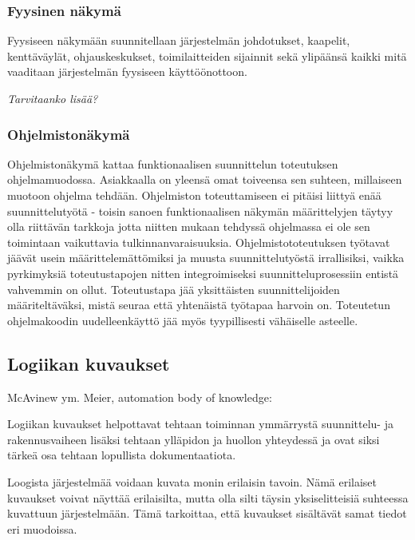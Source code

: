 \documentclass[finnish,12pt]{article}
\begin{document}
		\subsubsection{Fyysinen näkymä}

Fyysiseen näkymään suunnitellaan järjestelmän johdotukset, kaapelit, kenttäväylät,
ohjauskeskukset, toimilaitteiden sijainnit sekä ylipäänsä kaikki mitä vaaditaan 
järjestelmän fyysiseen käyttöönottoon.

\emph{Tarvitaanko lisää?}


		\subsubsection{Ohjelmistonäkymä}

Ohjelmistonäkymä kattaa funktionaalisen suunnittelun toteutuksen ohjelmamuodossa.
Asiakkaalla on yleensä omat toiveensa sen suhteen, millaiseen muotoon ohjelma tehdään.
Ohjelmiston toteuttamiseen ei pitäisi liittyä enää suunnittelutyötä - toisin sanoen funktionaalisen näkymän määrittelyjen täytyy olla riittävän tarkkoja jotta niitten mukaan tehdyssä ohjelmassa ei ole sen toimintaan vaikuttavia tulkinnanvaraisuuksia.
Ohjelmistototeutuksen työtavat jäävät usein määrittelemättömiksi ja muusta suunnittelutyöstä irrallisiksi,
vaikka pyrkimyksiä toteutustapojen nitten integroimiseksi suunnitteluprosessiin entistä vahvemmin on ollut.
Toteutustapa jää yksittäisten suunnittelijoiden määriteltäväksi, mistä seuraa että yhtenäistä työtapaa harvoin on.
Toteutetun ohjelmakoodin uudelleenkäyttö jää myös tyypillisesti vähäiselle asteelle.


	\subsection{Logiikan kuvaukset}


McAvinew ym. \cite{RefWorks:53}
Meier, automation body of knowledge: \cite{RefWorks:54}

Logiikan kuvaukset helpottavat tehtaan toiminnan ymmärrystä suunnittelu- ja rakennusvaiheen lisäksi tehtaan ylläpidon ja huollon yhteydessä ja
ovat siksi tärkeä osa tehtaan lopullista dokumentaatiota.

Loogista järjestelmää voidaan kuvata monin erilaisin tavoin.
Nämä erilaiset kuvaukset voivat näyttää erilaisilta, mutta olla silti täysin yksiselitteisiä suhteessa kuvattuun järjestelmään.
Tämä tarkoittaa, että kuvaukset sisältävät samat tiedot eri muodoissa.
\end{document}
